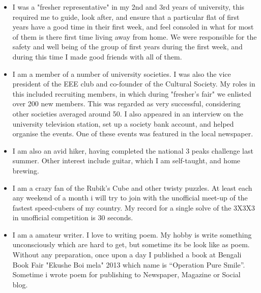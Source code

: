 \documentclass[11pt,a4paper,sans]{moderncv}        %
\begin{document}
\begin{itemize}

\item{I was a "fresher representative" in my 2nd and 3rd years of university, this required me to guide, look after, and ensure that a particular flat of first years have a good time in their first week, and feel consoled in what for most of them is there first time living away from home. We were responsible for the safety and well being of the group of first years during the first week, and during this time I made good friends with all of them.}

\vspace{6pt}

\item{I am a member of a number of university societies. I was also the vice president of the EEE club and co-founder of the Cultural Society. My roles in this included recruiting members, in which during "fresher's fair" we enlisted over 200 new members. This was regarded as very successful, considering other societies averaged around 50. I also appeared in an interview on the university television station, set up a society bank account, and helped organise the events. One of these events was featured in the local newspaper.}

\vspace{6pt}

\item{I am also an avid hiker, having completed the national 3 peaks challenge last summer. Other interest include guitar, which I am self-taught, and home brewing.}

\vspace{6pt}

\item{I am a crazy fan of the Rubik's Cube and other twisty puzzles. At least each any weekend of a month i will try to join with the unofficial meet-up of the fastest speed-cubers of my country.
My record for a single solve of the 3X3X3 in unofficial competition is 30 seconds.}

\vspace{6pt}

\item{I am a amateur writer. I love to writing poem. My hobby is write something unconsciously which are hard to get, but sometime its be look like as poem. Without any preparation, once upon a day I published a book at Bengali Book Fair "Ekushe Boi mela" 2013 which name is “Operation Pure Smile”. Sometime i wrote poem for publishing to Newspaper, Magazine or Social blog.}

\end{itemize}
\end{document}
